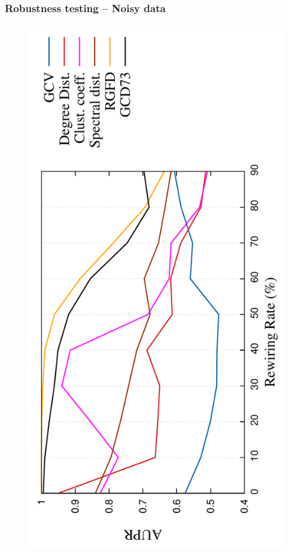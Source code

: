 \documentclass[11pt,xcolor=table]{beamer}
\begin{document}
\begin{frame}
  \frametitle{Robustness testing -- Noisy data}
  
  \begin{figure}
    \centering 
    \includegraphics[scale=0.48, angle=-90]
  {../code/final_results/trade_2010_thresholded/eval_results/rew_aupr_all_sigs2.pdf}
  \end{figure}

\end{frame}
\end{document}
